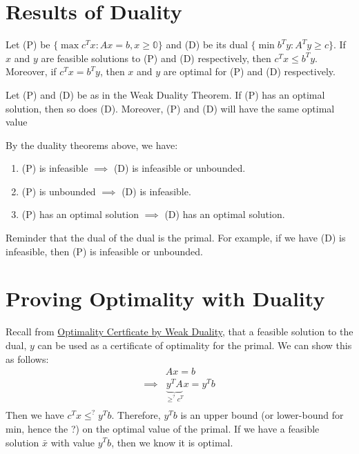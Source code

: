 \documentclass[a4paper]{report}
\begin{document}
\section{Results of Duality}
\begin{theorem}
  Let (P) be $\{\max c^Tx : Ax = b, x\geq \mathbb 0\}$ and (D) be its dual $\{\min b^Ty : A^Ty \geq c\}$. If $x$ and $y$ are feasible solutions to (P) and (D) respectively, then $c^T x \leq b^T y$. Moreover, if $c^T x = b^T y$, then $x$ and $y$ are optimal for (P) and (D) respectively.
\end{theorem}
\begin{theorem}
  Let (P) and (D) be as in the Weak Duality Theorem. If (P) has an optimal solution, then so does (D). Moreover, (P) and (D) will have the same optimal value
\end{theorem}
\begin{corollary}
  By the duality theorems above, we have:
\begin{enumerate}
  \item (P) is infeasible $\implies$ (D) is infeasible or unbounded.
  \item (P) is unbounded $\implies$ (D) is infeasible.
  \item (P) has an optimal solution $\implies$ (D) has an optimal solution.
\end{enumerate}
Reminder that the dual of the dual is the primal. For example, if we have (D) is infeasible, then (P) is infeasible or unbounded. 
\end{corollary}

\section{Proving Optimality with Duality}
Recall from \hyperref[optimality:ii]{Optimality Certficate by Weak Duality}, that a feasible solution to the dual, $y$ can be used as a certificate of optimality for the primal. We can show this as follows:
\begin{align*}
  & Ax = b \\
  \implies & \underbrace{y^TA}_{\geq^? c^T}x = y^T b \\
\end{align*}
Then we have $c^Tx \leq^? y^T b$. Therefore, $y^T b$ is an upper bound (or lower-bound for min, hence the ?) on the optimal value of the primal. If we have a feasible solution $\bar x$ with value $y^T b$, then we know it is optimal. 
\end{document}
